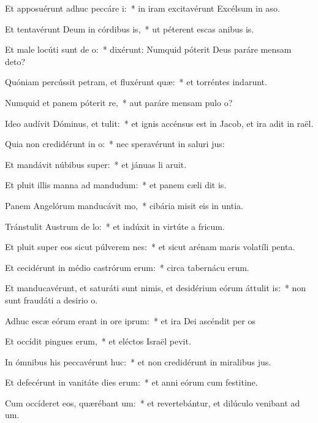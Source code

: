 \item Et apposuérunt adhuc peccáre i:~* in iram excitavérunt Excélsum in aso.
\item Et tentavérunt Deum in córdibus is,~* ut péterent escas anibus is.
\item Et male locúti sunt de o:~* dixérunt: Numquid póterit Deus paráre mensam  deto?
\item Quóniam percússit petram, et fluxérunt quæ:~* et torréntes indarunt.
\item Numquid et panem póterit re,~* aut paráre mensam pulo o?
\item Ideo audívit Dóminus, et tulit:~* et ignis accénsus est in Jacob, et ira adit in raël.
\item Quia non credidérunt in o:~* nec speravérunt in saluri jus:
\item Et mandávit núbibus super:~* et jánuas li aruit.
\item Et pluit illis manna ad mandudum:~* et panem cæli dit is.
\item Panem Angelórum manducávit mo,~* cibária misit eis in untia.
\item Tránstulit Austrum de lo:~* et indúxit in virtúte a fricum.
\item Et pluit super eos sicut púlverem nes:~* et sicut arénam maris volatíli penta.
\item Et cecidérunt in médio castrórum erum:~* circa tabernácu erum.
\item Et manducavérunt, et saturáti sunt nimis, et desidérium eórum áttulit is:~* non sunt fraudáti a desirio o.
\item Adhuc escæ eórum erant in ore iprum:~* et ira Dei ascéndit per os
\item Et occídit pingues erum,~* et eléctos Israël pevit.
\item In ómnibus his peccavérunt huc:~* et non credidérunt in miralibus jus.
\item Et defecérunt in vanitáte dies erum:~* et anni eórum cum festitine.
\item Cum occíderet eos, quærébant um:~* et revertebántur, et dilúculo venibant ad um.
